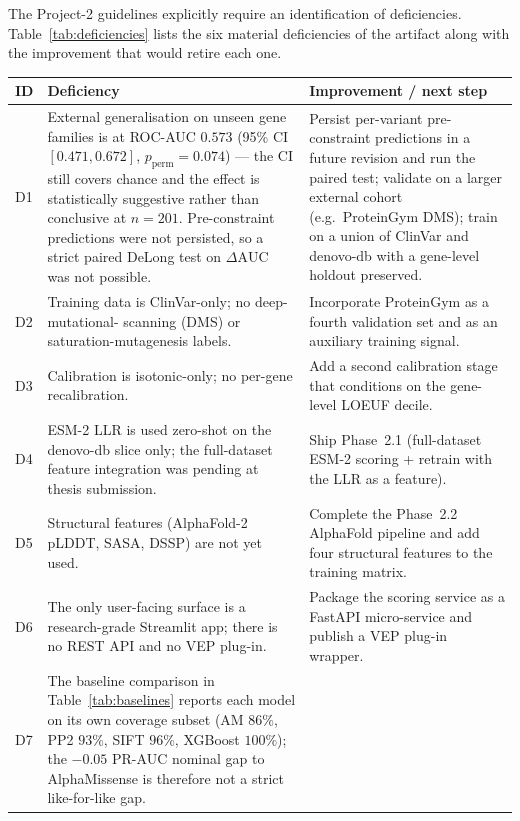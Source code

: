 \documentclass[11pt,a4paper,oneside]{report}
\begin{document}
The Project-2 guidelines explicitly require an
identification of deficiencies. Table~\ref{tab:deficiencies}
lists the six material deficiencies of the artifact along
with the improvement that would retire each one.

\begin{table}[htbp]
\centering
\footnotesize
\begin{tabularx}{\linewidth}{@{}l X X@{}}
\toprule
\textbf{ID} & \textbf{Deficiency} & \textbf{Improvement / next step} \\
\midrule
D1 & External generalisation on unseen gene families
is at ROC-AUC $0.573$ (95\% CI $[0.471, 0.672]$,
$p_{\text{perm}}=0.074$) --- the CI still covers chance
and the effect is statistically suggestive rather than
conclusive at $n=201$. Pre-constraint predictions were
not persisted, so a strict paired DeLong test on
$\Delta\text{AUC}$ was not possible. &
Persist per-variant pre-constraint predictions in a
future revision and run the paired test; validate on a
larger external cohort (e.g.\ ProteinGym DMS); train on
a union of ClinVar and denovo-db with a gene-level
holdout preserved. \\
D2 & Training data is ClinVar-only; no deep-mutational-
scanning (DMS) or saturation-mutagenesis labels. &
Incorporate ProteinGym \citep{notin2023proteingym} as a
fourth validation set and as an auxiliary training signal. \\
D3 & Calibration is isotonic-only; no per-gene
recalibration. &
Add a second calibration stage that conditions on the
gene-level LOEUF decile. \\
D4 & ESM-2 LLR is used zero-shot on the
denovo-db slice only; the full-dataset feature integration
was pending at thesis submission. &
Ship Phase~2.1 (full-dataset ESM-2 scoring + retrain with
the LLR as a feature). \\
D5 & Structural features (AlphaFold-2 pLDDT, SASA, DSSP)
are not yet used. &
Complete the Phase~2.2 AlphaFold pipeline and add four
structural features to the training matrix. \\
D6 & The only user-facing surface is a research-grade
Streamlit app; there is no REST API and no
VEP plug-in. &
Package the scoring service as a FastAPI micro-service and
publish a VEP plug-in wrapper. \\
D7 & The baseline comparison in Table~\ref{tab:baselines}
reports each model on its own coverage subset (AM $86\%$,
PP2 $93\%$, SIFT $96\%$, XGBoost $100\%$); the
$-0.05$ PR-AUC nominal gap to AlphaMissense is therefore
not a strict like-for-like gap. &

\end{tabularx}
\end{table}
\end{document}
